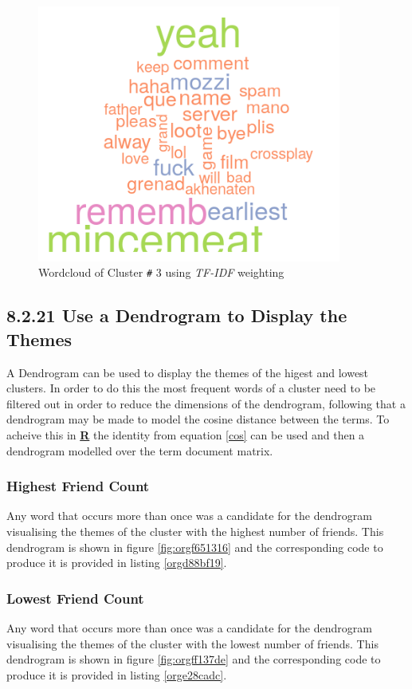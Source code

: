 \documentclass[11pt]{article}
\begin{document}
\begin{figure}[htbp]
\centering
\includegraphics[width=10cm]{./Figures/Cluster3Cloud.png}
\caption{\label{fig:orgc6efce4}Wordcloud of Cluster \texttt{\#} 3 using \emph{TF-IDF} weighting}
\end{figure}

\subsection{8.2.21 Use a Dendrogram to Display the Themes}
\label{sec:orgc03a127}
A Dendrogram can be used to display the themes of the higest and lowest
clusters. In order to do this the most frequent words of a cluster need to be
filtered out in order to reduce the dimensions of the dendrogram, following that
a dendrogram may be made to model the cosine distance between the terms. To
acheive this in \textbf{\textbf{\uline{R}}} the identity from equation \eqref{cos} can be used and
then a dendrogram modelled over the term document matrix.


\subsubsection{Highest Friend Count}
\label{sec:org4fabe50}
Any word that occurs more than once was a candidate for the dendrogram visualising the themes of the cluster with the highest number of friends. This dendrogram is shown in figure \ref{fig:orgf651316} and the corresponding code to produce it is provided in listing \ref{orgd88bf19}.

\subsubsection{Lowest Friend Count}
\label{sec:org6572820}
Any word that occurs more than once was a candidate for the dendrogram visualising the themes of the cluster with the lowest number of friends. This dendrogram is shown in figure \ref{fig:orgff137de} and the corresponding code to produce it is provided in listing \ref{orge28cadc}.
\end{document}

